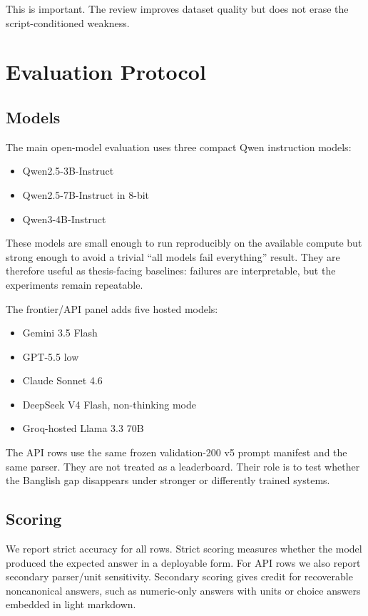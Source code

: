 This is important. The review improves dataset quality but does not erase the script-conditioned weakness.

\section{Evaluation Protocol}

\subsection{Models}

The main open-model evaluation uses three compact Qwen instruction models:

\begin{itemize}
\item Qwen2.5-3B-Instruct
\item Qwen2.5-7B-Instruct in 8-bit
\item Qwen3-4B-Instruct
\end{itemize}

These models are small enough to run reproducibly on the available compute but strong enough to avoid a trivial ``all models fail everything'' result. They are therefore useful as thesis-facing baselines: failures are interpretable, but the experiments remain repeatable.

The frontier/API panel adds five hosted models:

\begin{itemize}
\item Gemini 3.5 Flash
\item GPT-5.5 low
\item Claude Sonnet 4.6
\item DeepSeek V4 Flash, non-thinking mode
\item Groq-hosted Llama 3.3 70B
\end{itemize}

The API rows use the same frozen validation-200 v5 prompt manifest and the same parser. They are not treated as a leaderboard. Their role is to test whether the Banglish gap disappears under stronger or differently trained systems.

\subsection{Scoring}

We report strict accuracy for all rows. Strict scoring measures whether the model produced the expected answer in a deployable form. For API rows we also report secondary parser/unit sensitivity. Secondary scoring gives credit for recoverable noncanonical answers, such as numeric-only answers with units or choice answers embedded in light markdown.

